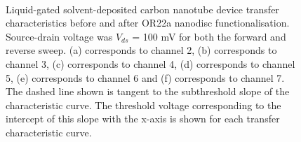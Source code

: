 \documentclass[
  a4paper,
]{scrbook}
\begin{document}
\begin{figure}
\begin{minipage}[t]{0.45\linewidth}
{{}

}

\end{minipage}%
%
\begin{minipage}[t]{0.01\linewidth}

{\centering 

~

}

\end{minipage}%

\caption{\label{fig-solvent-deposited-sensing-TX}Liquid-gated
solvent-deposited carbon nanotube device transfer characteristics before
and after OR22a nanodisc functionalisation. Source-drain voltage was
\(V_{ds}\) = 100 mV for both the forward and reverse sweep. (a)
corresponds to channel 2, (b) corresponds to channel 3, (c) corresponds
to channel 4, (d) corresponds to channel 5, (e) corresponds to channel 6
and (f) corresponds to channel 7. The dashed line shown is tangent to
the subthreshold slope of the characteristic curve. The threshold
voltage corresponding to the intercept of this slope with the x-axis is
shown for each transfer characteristic curve.}

\end{figure}
\end{document}

